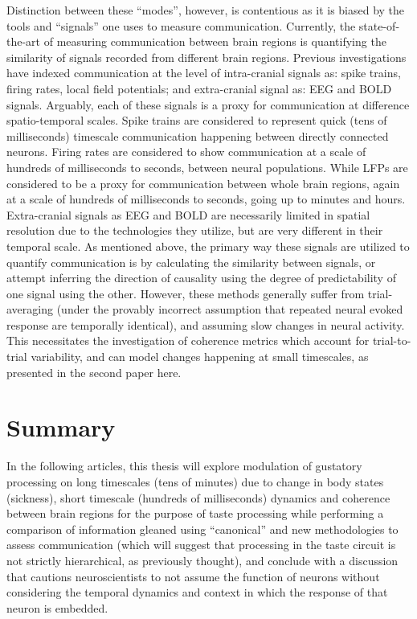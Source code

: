 \begin{refsection}
Distinction between these “modes”, however, is contentious as it is biased by the tools and “signals” one uses to measure communication. Currently, the state-of-the-art of measuring communication between brain regions is quantifying the similarity of signals recorded from different brain regions. Previous investigations have indexed communication at the level of intra-cranial signals as: spike trains, firing rates, local field potentials; and extra-cranial signal as: EEG and BOLD signals. Arguably, each of these signals is a proxy for communication at difference spatio-temporal scales. Spike trains are considered to represent quick (tens of milliseconds) timescale communication happening between directly connected neurons. Firing rates are considered to show communication at a scale of hundreds of milliseconds to seconds, between neural populations. While LFPs are considered to be a proxy for communication between whole brain regions, again at a scale of hundreds of milliseconds to seconds, going up to minutes and hours. Extra-cranial signals as EEG and BOLD are necessarily limited in spatial resolution due to the technologies they utilize, but are very different in their temporal scale. As mentioned above, the primary way these signals are utilized to quantify communication is by calculating the similarity between signals, or attempt inferring the direction of causality using the degree of predictability of one signal using the other. However, these methods generally suffer from trial-averaging (under the provably incorrect assumption that repeated neural evoked response are temporally identical), and assuming slow changes in neural activity. This necessitates the investigation of coherence metrics which account for trial-to-trial variability, and can model changes happening at small timescales, as presented in the second paper here.

\section{Summary}
In the following articles, this thesis will explore modulation of gustatory processing on long timescales (tens of minutes) due to change in body states (sickness), short timescale (hundreds of milliseconds) dynamics and coherence between brain regions for the purpose of taste processing while performing a comparison of information gleaned using “canonical” and new methodologies to assess communication (which will suggest that processing in the taste circuit is not strictly hierarchical, as previously thought), and conclude with a discussion that cautions neuroscientists to not assume the function of neurons without considering the temporal dynamics and context in which the response of that neuron is embedded.

\printbibliography[title={References}]
\end{refsection}